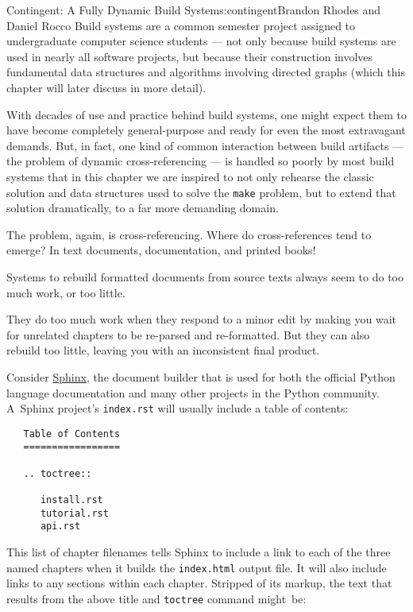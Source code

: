 \begin{aosachapter}{Contingent: A Fully Dynamic Build System}{s:contingent}{Brandon Rhodes and Daniel Rocco}
Build systems are a common semester project assigned to undergraduate
computer science students --- not only because build systems are used in
nearly all software projects, but because their construction involves
fundamental data structures and algorithms involving directed graphs
(which this chapter will later discuss in more detail).

With decades of use and practice behind build systems, one might expect
them to have become completely general-purpose and ready for even the
most extravagant demands. But, in fact, one kind of common interaction
between build artifacts --- the problem of dynamic cross-referencing ---
is handled so poorly by most build systems that in this chapter we are
inspired to not only rehearse the classic solution and data structures
used to solve the \texttt{make} problem, but to extend that solution
dramatically, to a far more demanding domain.

The problem, again, is cross-referencing. Where do cross-references tend
to emerge? In text documents, documentation, and printed books!

\label{the-problem-building-document-systems}

Systems to rebuild formatted documents from source texts always seem to
do too much work, or too little.

They do too much work when they respond to a minor edit by making you
wait for unrelated chapters to be re-parsed and re-formatted. But they
can also rebuild too little, leaving you with an inconsistent final
product.

Consider \href{http://sphinx-doc.org/}{Sphinx}, the document builder
that is used for both the official Python language documentation and
many other projects in the Python community. A~Sphinx project's
\texttt{index.rst} will usually include a table of contents:

\begin{verbatim}
   Table of Contents
   =================

   .. toctree::

      install.rst
      tutorial.rst
      api.rst
\end{verbatim}

This list of chapter filenames tells Sphinx to include a link to each of
the three named chapters when it builds the \texttt{index.html} output
file. It will also include links to any sections within each chapter.
Stripped of its markup, the text that results from the above title and
\texttt{toctree} command might~be:


\end{aosachapter}
